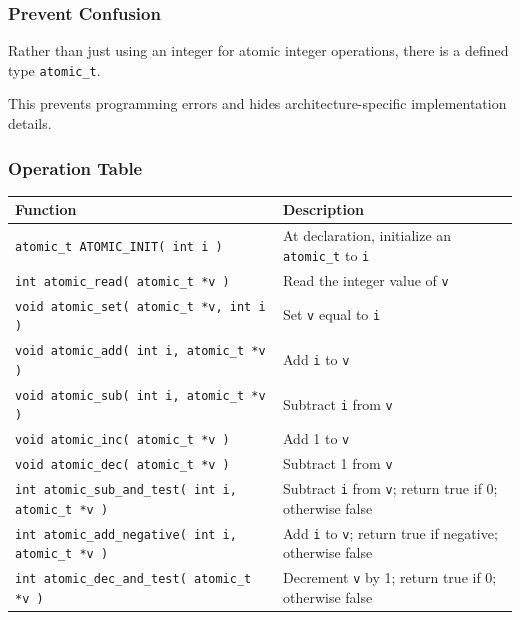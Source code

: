 \begin{frame}
\frametitle{Prevent Confusion}

Rather than just using an integer for atomic integer operations, there is a defined type \texttt{atomic\_t}.

 This prevents programming errors and hides architecture-specific implementation details.

\end{frame}


\begin{frame}
\frametitle{Operation Table}

{\scriptsize
\begin{center}
\begin{tabular}{l|l}
	\textbf{Function} & \textbf{Description}\\\hline

	\texttt{atomic\_t ATOMIC\_INIT( int i )} & At declaration, initialize an \texttt{atomic\_t} to \texttt{i}\\\hline

\texttt{int atomic\_read( atomic\_t *v )} &  Read the integer value of \texttt{v}\\\hline

\texttt{void atomic\_set( atomic\_t *v, int i )} & Set \texttt{v} equal to \texttt{i}\\\hline

\texttt{void atomic\_add( int i, atomic\_t *v )} & Add \texttt{i} to \texttt{v}\\\hline

\texttt{void atomic\_sub( int i, atomic\_t *v )} & Subtract \texttt{i} from \texttt{v}\\\hline

\texttt{void atomic\_inc( atomic\_t *v )} & Add 1 to \texttt{v}\\\hline

\texttt{void atomic\_dec( atomic\_t *v )} & Subtract 1 from \texttt{v}\\\hline

\texttt{int atomic\_sub\_and\_test( int i, atomic\_t *v )} & Subtract \texttt{i} from \texttt{v}; return true if 0; otherwise false\\\hline

\texttt{int atomic\_add\_negative( int i, atomic\_t *v )} & Add \texttt{i} to \texttt{v}; return true if negative; otherwise false\\\hline

\texttt{int atomic\_dec\_and\_test( atomic\_t *v )} & Decrement \texttt{v} by 1; return true if 0; otherwise false\\\hline


\end{tabular}
\end{center}}
\end{frame}

